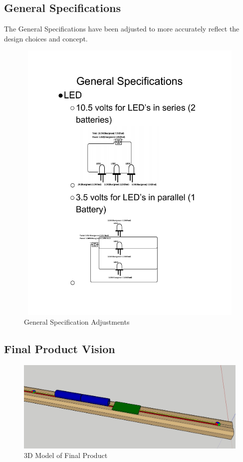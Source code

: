 \documentclass[12pt]{article}
\begin{document}
{{	\subsection{General Specifications}
	The General Specifications have been adjusted to more accurately reflect the design choices and concept.		
		\begin{figure}[!htb]
			\centering
			\includegraphics[width = 120mm, height = 140mm]{assets/3_General_Specifications.pdf}
			\caption{General Specification Adjustments \label{overflow}}
		\end{figure}
		\clearpage

	\subsection{Final Product Vision}
		\begin{figure}[ht!]
			\centering
			\includegraphics[width=170mm]{assets/Lightbar_Model.jpg}
			\caption{3D Model of Final Product \label{overflow}}
		\end{figure}
		\clearpage
		
}}
\end{document}
